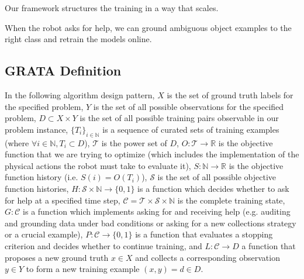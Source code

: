\documentclass[conference]{IEEEtran}
\begin{document}
Our framework structures the training in a way that scales. 

When the robot asks for help, we can ground ambiguous object examples to the right class
and retrain the models online.

\subsection{GRATA Definition}

In the following algorithm design pattern, 
$X$ is the set of ground truth labels for the specified problem,
$Y$ is the set of all possible observations for the specified problem,
\mbox{$D \subset X \times Y$} is the set of all possible training pairs observable in our problem instance,
\mbox{$\{T_i\}_{i \in \mathbb{N}}$} is a sequence of curated sets of training examples (where \mbox{$\forall i \in \mathbb{N}, T_i \subset D$}),  
$\mathcal{T}$ is the power set of $D$,
\mbox{$O: \mathcal{T} \to \mathbb{R}$} is the objective function that we are trying to optimize 
(which includes the implementation of the physical actions the robot must take to evaluate it),
\mbox{$S: \mathbb{N} \to \mathbb{R}$} is the objective function history (i.e. \mbox{$S(i) = O(T_i)$}),
$\mathcal{S}$ is the set of all possible objective function histories,
\mbox{$H: \mathcal{S} \times \mathbb{N} \to \{0,1\}$} is a function which decides whether to ask for help at
a specified time step,
\mbox{$\mathcal{C} = \mathcal{T} \times \mathcal{S} \times \mathbb{N}$} is the complete training state,
\mbox{$G: \mathcal{C}$} is a function which implements asking for and receiving help (e.g. auditing and grounding data under bad conditions
or asking for a new collections strategy or a crucial example),
\mbox{$P: \mathcal{C} \to \{0,1\}$} is a function that evaluates a stopping criterion and decides whether to continue training,
and \mbox{$L: \mathcal{C} \to D$} a function that proposes a new ground truth $x \in X$ and collects a corresponding observation $y \in Y$ to form
a new training example \mbox{$(x,y) = d \in D$}. 
\end{document}
